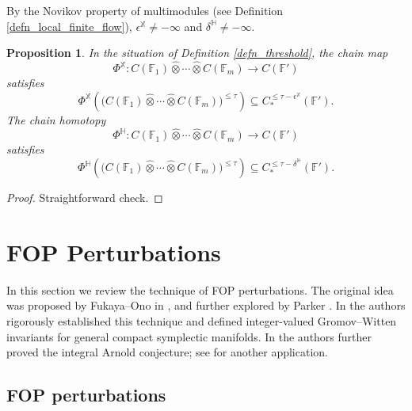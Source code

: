 \documentclass[reqno, 10pt]{amsart}
\numberwithin{equation}{section}
\numberwithin{equation}{section}
\renewcommand{\subset}{\subseteq}
\newtheorem{prop}[thm]{Proposition}
\theoremstyle{definition}
\theoremstyle{remark}
\newcommand{\beqn}{\begin{equation*}}
\newcommand{\eeqn}{\end{equation*}}
\newcommand{\mb}{\mathbb}
\begin{document}
By the Novikov property of multimodules (see Definition \ref{defn_local_finite_flow}), $\epsilon^{\mb X} \neq -\infty$ and $\delta^{\mb H} \neq -\infty$.



\begin{prop}\label{prop_spectral_continuity}
In the situation of Definition \ref{defn_threshold}, the chain map
\beqn
\Phi^{\mb X}: C({\mb F}_1) \widehat{\otimes} \cdots \widehat{\otimes} C({\mb F}_m) \to C({\mb F}')
\eeqn
satisfies 
\beqn
\Phi^{\mb X} \left( \big( C ({\mb F}_1) \widehat{\otimes} \cdots \widehat{\otimes} C ({\mb F}_m) \big)^{\leq \tau} \right) \subset C_*^{ \leq \tau - \epsilon^{\mb X}} ({\mb F}').
\eeqn
The chain homotopy
\beqn
\Phi^{\mb H}: C({\mb F}_1) \widehat{\otimes}\cdots \widehat{\otimes} C({\mb F}_m) \to C({\mb F}')
\eeqn
satisfies
\beqn
\Phi^{\mb H} \left( \big( C ({\mb F}_1) \widehat{\otimes} \cdots \widehat{\otimes} C ({\mb F}_m) \big)^{\leq \tau} \right) \subset C_*^{ \leq \tau - \delta^{\mb H}} ({\mb F}').
\eeqn
\end{prop}

\begin{proof}
Straightforward check.
\end{proof}

















\section{FOP Perturbations}\label{sec:FOP-perturb}

In this section we review the technique of FOP perturbations. The original idea was proposed by Fukaya--Ono in \cite{Fukaya_Ono_integer}, and further explored by Parker \cite{BParker_integer}. In \cite{Bai_Xu_2022} the authors rigorously established this technique and defined integer-valued Gromov--Witten invariants for general compact symplectic manifolds. In \cite{Bai_Xu_Arnold} the authors further proved the integral Arnold conjecture; see \cite{BPX} for another application.

\subsection{FOP perturbations}
\end{document}
